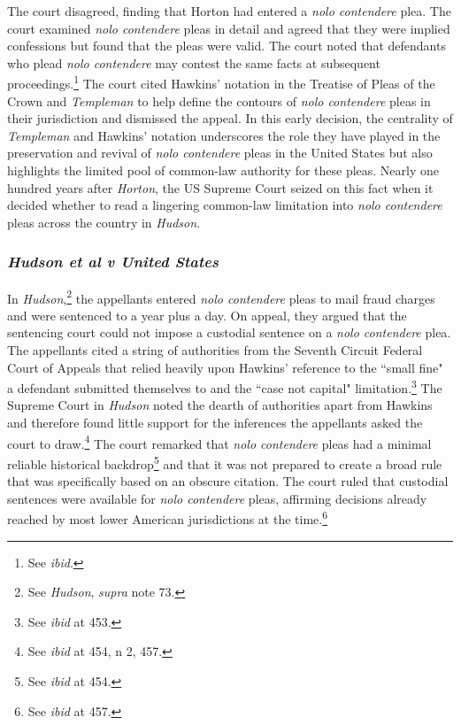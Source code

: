 The court disagreed, finding that Horton had entered a \textit{nolo contendere} plea. The court examined \textit{nolo contendere} pleas in detail and agreed that they were implied confessions but found that the pleas were valid. The court noted that defendants who plead \textit{nolo contendere} may contest the same facts at subsequent proceedings.\footnote{See \textit{ibid}.} The court cited Hawkins' notation in the Treatise of Pleas of the Crown and \textit{Templeman} to help define the contours of \textit{nolo contendere} pleas in their jurisdiction and dismissed the appeal. In this early decision, the centrality of \textit{Templeman} and Hawkins' notation underscores the role they have played in the preservation and revival of \textit{nolo contendere} pleas in the United States but also highlights the limited pool of common-law authority for these pleas. Nearly one hundred years after \textit{Horton}, the US Supreme Court seized on this fact when it decided whether to read a lingering common-law limitation into \textit{nolo contendere} pleas across the country in \textit{Hudson}.

\subsubsection{\textit{Hudson et al v United States}}

In \textit{Hudson},\footnote{See \textit{Hudson}, \textit{supra} note 73.} the appellants entered \textit{nolo contendere} pleas to mail fraud charges and were sentenced to a year plus a day. On appeal, they argued that the sentencing court could not impose a custodial sentence on a \textit{nolo contendere} plea. The appellants cited a string of authorities from the Seventh Circuit Federal Court of Appeals that relied heavily upon Hawkins' reference to the ``small fine" a defendant submitted themselves to and the ``case not capital" limitation.\footnote{See \textit{ibid} at 453.} The Supreme Court in \textit{Hudson} noted the dearth of authorities apart from Hawkins and therefore found little support for the inferences the appellants asked the court to draw.\footnote{See \textit{ibid} at 454, n 2, 457.} The court remarked that \textit{nolo contendere} pleas had a minimal reliable historical backdrop\footnote{See \textit{ibid} at 454.} and that it was not prepared to create a broad rule that was specifically based on an obscure citation. The court ruled that custodial sentences were available for \textit{nolo contendere} pleas, affirming decisions already reached by most lower American jurisdictions at the time.\footnote{See \textit{ibid} at 457.}

